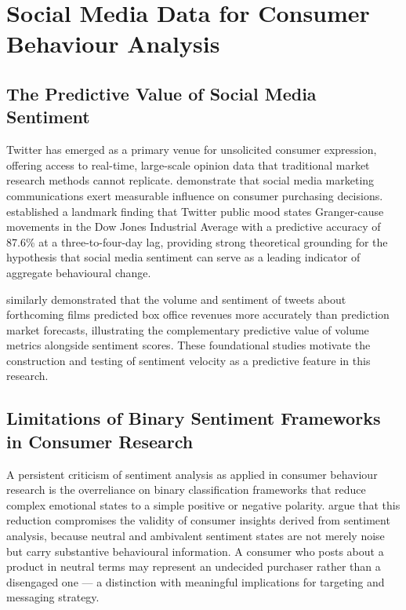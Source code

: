 \section{Social Media Data for Consumer Behaviour Analysis}

\subsection{The Predictive Value of Social Media Sentiment}

Twitter has emerged as a primary venue for unsolicited consumer expression, offering access to real-time, large-scale opinion data that traditional market research methods cannot replicate. \citet{antczak2024influence} demonstrate that social media marketing communications exert measurable influence on consumer purchasing decisions. \citet{bollen2011twitter} established a landmark finding that Twitter public mood states Granger-cause movements in the Dow Jones Industrial Average with a predictive accuracy of 87.6\% at a three-to-four-day lag, providing strong theoretical grounding for the hypothesis that social media sentiment can serve as a leading indicator of aggregate behavioural change.

\citet{asur2010predicting} similarly demonstrated that the volume and sentiment of tweets about forthcoming films predicted box office revenues more accurately than prediction market forecasts, illustrating the complementary predictive value of volume metrics alongside sentiment scores. These foundational studies motivate the construction and testing of sentiment velocity as a predictive feature in this research.

\subsection{Limitations of Binary Sentiment Frameworks in Consumer Research}

A persistent criticism of sentiment analysis as applied in consumer behaviour research is the overreliance on binary classification frameworks that reduce complex emotional states to a simple positive or negative polarity. \citet{mohammad2013crowdsourcing} argue that this reduction compromises the validity of consumer insights derived from sentiment analysis, because neutral and ambivalent sentiment states are not merely noise but carry substantive behavioural information. A consumer who posts about a product in neutral terms may represent an undecided purchaser rather than a disengaged one --- a distinction with meaningful implications for targeting and messaging strategy.

